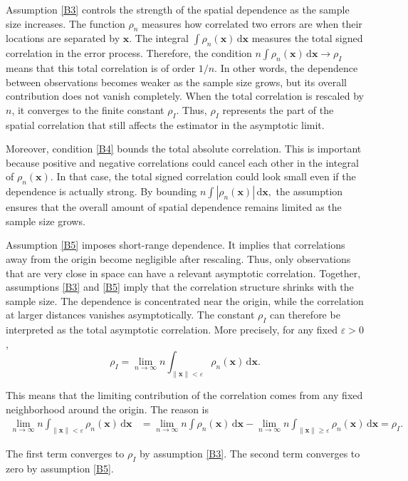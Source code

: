 \documentclass[12pt]{report} %
\newcommand{\bx}{\mathbf{x}}
\newcommand{\rd}{\mathrm{d}}
\begin{document}
Assumption \ref{B3} controls the strength of the spatial dependence as the sample size increases. The function $\rho_n$ measures how correlated two errors are when their locations are separated by $\bx$. The integral $\int \rho_n(\bx)\,\rd\bx$ measures the total signed correlation in the error process. Therefore, the condition $n\int \rho_n(\bx)\,\rd\bx \to \rho_I$ means that this total correlation is of order $1/n$. In other words, the dependence between observations becomes weaker as the sample size grows, but its overall contribution does not vanish completely. When the total correlation is rescaled by $n$, it converges to the finite constant $\rho_I$. Thus, $\rho_I$ represents the part of the spatial correlation that still affects the estimator in the asymptotic limit.

Moreover, condition \ref{B4} bounds the total absolute correlation. This is important because positive and negative correlations could cancel each other in the integral of $\rho_n(\bx)$. In that case, the total signed correlation could look small even if the dependence is actually strong. By bounding $n\int |\rho_n(\bx)|\,\rd\bx,$ the assumption ensures that the overall amount of spatial dependence remains limited as the sample size grows.

Assumption \ref{B5} imposes short-range dependence. It implies that correlations away from the origin become negligible after rescaling. Thus, only observations that are very close in space can have a relevant asymptotic correlation. Together, assumptions \ref{B3} and \ref{B5} imply that the correlation structure shrinks with the sample size. The dependence is concentrated near the origin, while the correlation at larger distances vanishes asymptotically. The constant $\rho_I$ can therefore be interpreted as the total asymptotic correlation. More precisely, for any fixed $\varepsilon>0$,
$$ \rho_I = \lim_{n\to\infty} n\int_{\|\bx\|<\varepsilon}\rho_n(\bx)\,\rd\bx.$$

This means that the limiting contribution of the correlation comes from any fixed neighborhood around the origin. The reason is
\[
\begin{aligned}
\lim_{n \to \infty} n \int_{\|\bx\|<\varepsilon} \rho_n(\bx) \, \rd \bx
&=
\lim_{n \to \infty} n \int \rho_n(\bx) \, \rd \bx -
\lim_{n \to \infty} n \int_{\|\bx\| \geq \varepsilon} \rho_n(\bx) \, \rd \bx =
\rho_I .
\end{aligned}
\]

The first term converges to $\rho_I$ by assumption \ref{B3}. The second term converges to zero by assumption \ref{B5}.
\end{document}
